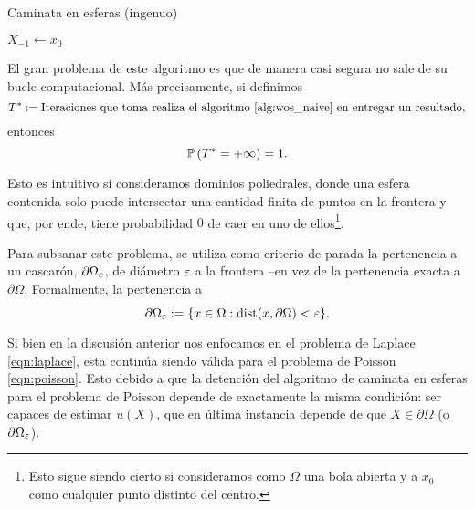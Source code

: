 \begin{algorithm}[H]\label{alg:wos_naive}
\caption{Caminata en esferas (ingenuo)}
    $X_{-1}\gets x_0$\;
\end{algorithm}

El gran problema de este algoritmo es que de manera casi segura no sale de su bucle computacional. Más precisamente, si definimos
\begin{equation}\label{stopping_time}
    T^{\ast}:=\text{Iteraciones que toma realiza el algoritmo \ref{alg:wos_naive} en entregar un resultado},
\end{equation}
entonces
\begin{equation*}
    \mathbb{P}\left(T^{\ast}=+\infty\right)=1.
\end{equation*}

Esto es intuitivo si consideramos dominios poliedrales, donde una esfera contenida solo puede intersectar una cantidad finita de puntos en la frontera y que, por ende, tiene probabilidad $0$ de caer en uno de ellos\footnote{Esto sigue siendo cierto si consideramos como $\Omega$ una bola abierta y a $x_0$ como cualquier punto distinto del centro.}.


Para subsanar este problema, se utiliza como criterio de parada la pertenencia a un cascarón, $\partial\Omega_{\operatorname{\varepsilon}}$, de diámetro $\operatorname{\varepsilon}$ a la frontera --en vez de la pertenencia exacta a $\partial\Omega$. Formalmente, la pertenencia a
\begin{equation}\label{def:eps_shell}
    \partial\Omega_{\operatorname{\varepsilon}} := \{x\in\Bar{\Omega}: \mbox{dist}(x,\partial\Omega)<\operatorname{\varepsilon}\}.
\end{equation}

Si bien en la discusión anterior nos enfocamos en el problema de Laplace \eqref{eqn:laplace}, esta continúa siendo válida para el problema de Poisson \eqref{eqn:poisson}. Esto debido a que la detención del algoritmo de caminata en esferas para el problema de Poisson depende de exactamente la misma condición: ser capaces de estimar $u(X)$, que en última instancia depende de que $X\in\partial\Omega$ (o $\partial\Omega_{\operatorname{\varepsilon}}$).

